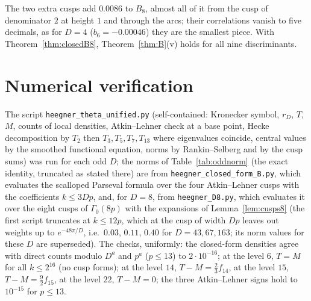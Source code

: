 \documentclass[11pt]{amsart}
\theoremstyle{remark}
\begin{document}
The two extra cusps add $0.0086$ to $B_8$, almost all of it from the cusp of denominator $2$ at height $1$ and through the arcs; their correlations vanish to five decimals, as for $D=4$ ($b_6=-0.00046$) they are the smallest piece. With Theorem~\ref{thm:closedB8}, Theorem~\ref{thm:B}(v) holds for all nine discriminants.

\section{Numerical verification}\label{sec:num}

The script \texttt{heegner\_theta\_unified.py} (self-contained: Kronecker symbol, $r_D$, $T$, $M$, counts of local densities, Atkin--Lehner check at a base point, Hecke decomposition by $T_2$ then $T_3,T_5,T_7,T_{13}$ where eigenvalues coincide, central values by the smoothed functional equation, norms by Rankin--Selberg and by the cusp sums) was run for each odd $D$; the norms of Table~\ref{tab:oddnorm} (the exact identity, truncated as stated there) are from \texttt{heegner\_closed\_form\_B.py}, which evaluates the scalloped Parseval formula over the four Atkin--Lehner cusps with the coefficients $k\le3Dp$, and, for $D=8$, from \texttt{heegner\_D8.py}, which evaluates it over the eight cusps of $\Gamma_0(8p)$ with the expansions of Lemma~\ref{lem:cusps8} (the first script truncates at $k\le12p$, which at the cusp of width $Dp$ leaves out weights up to $e^{-48\pi/D}$, i.e.\ $0.03$, $0.11$, $0.40$ for $D=43,67,163$; its norm values for these $D$ are superseded). The checks, uniformly: the closed-form densities agree with direct counts modulo $D^a$ and $p^a$ ($p\le13$) to $2\cdot10^{-16}$; at the level $6$, $T=M$ for all $k\le2^{16}$ (no cusp forms); at the level $14$, $T-M=\frac23f_{14}$, at the level $15$, $T-M=\frac92f_{15}$, at the level $22$, $T-M=0$; the three Atkin--Lehner signs hold to $10^{-15}$ for $p\le13$.
\end{document}
